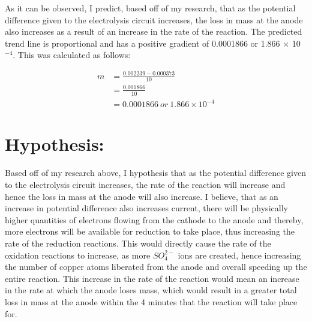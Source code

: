 \documentclass[11pt, a4]{article}
\begin{document}
\begin{figure}[H]
\begin{center}
					\end{center}		
				\end{figure}			
				
		As it can be observed, I predict, based off of my research, that as the potential difference given to the electrolysis circuit increases, the loss in mass at the anode also increases as a result of an increase in the rate of the reaction. The predicted trend line is proportional and has a positive gradient of 0.0001866 or 1.866 $\times$ 10 $^{-4}$. This was calculated as follows:
		
		\begin{equation*}
			\begin{split}
				m &= \frac{0.002239-0.000373}{10}\\
				&= \frac{0.001866}{10}\\
				&=0.0001866 \ or \ 1.866 \times 10 ^{-4}
			\end{split}
		\end{equation*}
		
	\section{Hypothesis:}
		Based off of my research above, I hypothesis that as the potential difference given to the electrolysis circuit increases, the rate of the reaction will increase and hence the loss in mass at the anode will also increase. I believe, that as an increase in potential difference also increases current, there will be physically higher quantities of electrons flowing from the cathode to the anode and thereby, more electrons will be available for reduction to take place, thus increasing the rate of the reduction reactions. This would directly cause the rate of the oxidation reactions to increase, as more $SO_{4}^{2-}$ ions are created, hence increasing the number of copper atoms liberated from the anode and overall speeding up the entire reaction. This increase in the rate of the reaction would mean an increase in the rate at which the anode loses mass, which would result in a greater total loss in mass at the anode within the 4 minutes that the reaction will take place for. 
		
\end{document}
